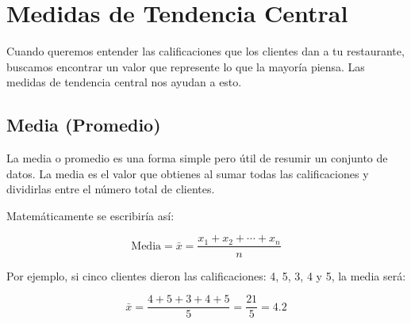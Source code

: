 \documentclass[
  spanish,
  letterpaper,
  DIV=11,
  numbers=noendperiod]{scrreprt}
\begin{document}
\section{Medidas de Tendencia
Central}\label{medidas-de-tendencia-central}

Cuando queremos entender las calificaciones que los clientes dan a tu
restaurante, buscamos encontrar un valor que represente lo que la
mayoría piensa. Las medidas de tendencia central nos ayudan a esto.

\subsection{Media (Promedio)}\label{media-promedio}

La media o promedio es una forma simple pero útil de resumir un conjunto
de datos. La media es el valor que obtienes al sumar todas las
calificaciones y dividirlas entre el número total de clientes.

\begin{tcolorbox}[enhanced jigsaw, colback=white, bottomrule=.15mm, opacityback=0, breakable, rightrule=.15mm, arc=.35mm, left=2mm, toprule=.15mm, colframe=quarto-callout-tip-color-frame, leftrule=.75mm]
\begin{minipage}[t]{5.5mm}
\textcolor{quarto-callout-tip-color}{\faLightbulb}
\end{minipage}%
\begin{minipage}[t]{\textwidth - 5.5mm}

Matemáticamente se escribiría así:

\[
\text{Media} = \bar{x} = \frac{x_1 + x_2 + \cdots + x_n}{n}
\]

\end{minipage}%
\end{tcolorbox}

Por ejemplo, si cinco clientes dieron las calificaciones: 4, 5, 3, 4 y
5, la media será:

\begin{tcolorbox}[enhanced jigsaw, colback=white, bottomrule=.15mm, opacityback=0, breakable, rightrule=.15mm, arc=.35mm, left=2mm, toprule=.15mm, colframe=quarto-callout-tip-color-frame, leftrule=.75mm]
\begin{minipage}[t]{5.5mm}
\textcolor{quarto-callout-tip-color}{\faLightbulb}
\end{minipage}%
\begin{minipage}[t]{\textwidth - 5.5mm}

\[
\bar{x} = \frac{4 + 5 + 3 + 4 + 5}{5} = \frac{21}{5} = 4.2
\]

\end{minipage}%
\end{tcolorbox}
\end{document}

